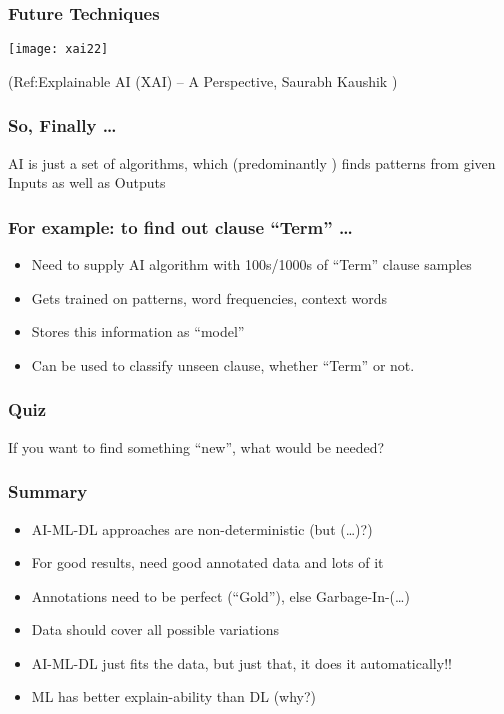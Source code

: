 \begin{frame}[fragile]\frametitle{Future Techniques}
\begin{center}
\texttt{[image: xai22]}
\end{center}

\tiny{(Ref:Explainable AI (XAI) – A Perspective, Saurabh Kaushik  )}
\end{frame}

\begin{frame}[fragile]\frametitle{So, Finally \ldots}

\begin{center}
AI is just a set of algorithms, 
which (predominantly ) finds patterns from given Inputs as well as Outputs
\end{center}
\end{frame}

\begin{frame}[fragile]\frametitle{For example: to find out clause ``Term'' \ldots}
\begin{itemize}
\item Need to supply AI algorithm with 100s/1000s of ``Term'' clause samples
\item Gets trained on patterns, word frequencies, context words
\item Stores this information as ``model''
\item Can be used to classify unseen clause, whether ``Term'' or not.
\end{itemize}
\end{frame}

\begin{frame}[fragile]\frametitle{Quiz}
If you want to find something ``new'', what would be needed?
\end{frame}

\begin{frame}[fragile]\frametitle{Summary}
\begin{itemize}
\item AI-ML-DL approaches are non-deterministic (but (\ldots)?)
\item For good results, need good annotated data and lots of it
\item Annotations need to be perfect (``Gold''), else Garbage-In-(\ldots)
\item Data should cover all possible variations
\item AI-ML-DL just fits the data, but just that, it does it automatically!!
\item ML has better explain-ability than DL (why?)
\end{itemize}
\end{frame}

